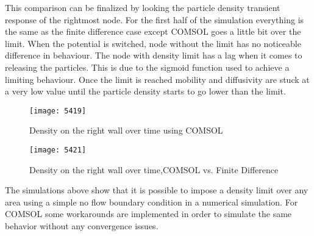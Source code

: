 \begin{doublespace}
This comparison can be finalized by looking the particle density transient response of the rightmost node. For the first half of the simulation everything is the same as the finite difference case except COMSOL goes a little bit over the limit. When the potential is switched, node without the limit has no noticeable difference in behaviour. The node with density limit has a lag when it comes to releasing the particles. This is due to the sigmoid function used to achieve a limiting behaviour. Once the limit is reached mobility and diffusivity are stuck at a very low value until the particle density starts to go lower than the limit.
\begin{figure}[ht]
\centering
\begin{minipage}[b]{0.45\linewidth}
\texttt{[image: 5419]}
\caption{Density on the right wall over time using COMSOL}
\label{5419}
\end{minipage}
\quad
\begin{minipage}[b]{0.45\linewidth}
\texttt{[image: 5421]}
\caption{Density on the right wall over time,COMSOL vs. Finite Difference}
\label{5421}
\end{minipage}
\end{figure}

The simulations above show that it is possible to impose a density limit over any area using a simple no flow boundary condition in a numerical simulation. For COMSOL some workarounds are implemented in order to simulate the same behavior without any convergence issues. 


\end{doublespace}